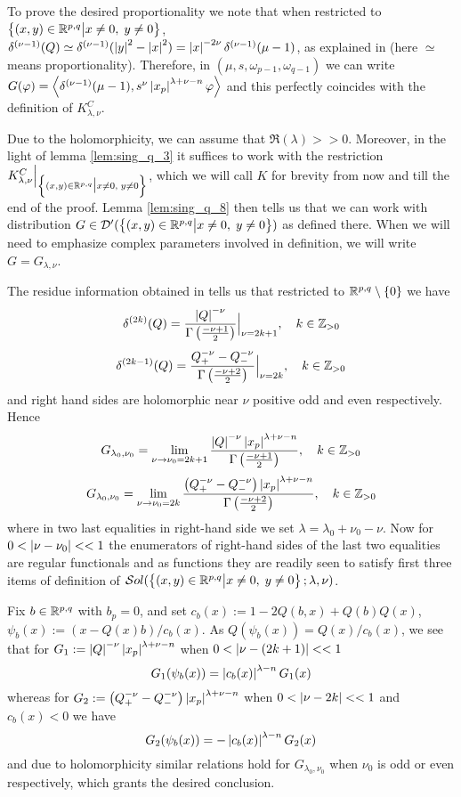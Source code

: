 \documentclass[10pt]{article} %
\newcommand{\D}{\mathcal{D}}
\theoremstyle{definition}
\theoremstyle{remark}
\begin{document}
\begin{myproof}
	To prove the desired proportionality we note that when restricted to $\Upp$, $\delta^{(\nu-1)}(Q)\simeq
	\delta^{(\nu-1)}(\myabs{y}^2-\myabs{x}^2)=\myabs{x}^{-2\nu}\delta^{(\nu-1)}(\mu-1)$, as explained in
	\cite[ch. III, sec 1.7]{gelfand1980distribution} (here $\simeq$ means proportionality). Therefore, in 
	$(\mu,s,\omega_{p-1},\omega_{q-1}
	)$ we can write $G(\phi)=\myabra{\delta^{(\nu-1)}(\mu-1),s^{\nu}\myabs{x_p}^{\lambda+\nu-n}\phi}$ and this
	perfectly coincides with the definition of $K_{\lambda,\nu}^C$.
\end{myproof}
\begin{myproof}
	Due to the holomorphicity, we can assume that $\Re(\lambda)>>0$.
	Moreover, in the light of lemma \ref{lem:sing_q_3} it suffices to work with the restriction $K^C_{\lambda,\nu}\Big|_{\Upp}$,
	which we will call $K$ for brevity from now and till the end of the proof. Lemma \ref{lem:sing_q_8} then tells
	us that we can work with distribution $G\in\D'(\Upp)$ as defined there. When we will need to emphasize complex parameters
	involved in definition, we will write $G=G_{\lambda,\nu}$.

	The residue information obtained in \cite[ch. III, sec 2.2]{gelfand1980distribution} tells us that restricted to 
	$\R^{p,q}\setminus\left\{ 0 \right\}$ we have
	\[\delta^{(2k)}(Q)=\frac{\myabs{Q}^{-\nu}}{\Gamma\left( \frac{-\nu+1}{2} \right)}\Big|_{\nu=2k+1},\quad k\in\Z_{>0}\]
	\[\delta^{(2k-1)}(Q)=\frac{Q_+^{-\nu}-Q_-^{-\nu}}{\Gamma\left( \frac{-\nu+2}{2} \right)}\Big|_{\nu=2k},\quad k\in\Z_{>0}\]
	and right hand sides are holomorphic near $\nu$ positive odd and even respectively. Hence
	\[G_{\lambda_0,\nu_0}=\lim_{\nu\to\nu_0=2k+1}\frac{\myabs{Q}^{-\nu}\myabs{x_p}^{\lambda+\nu-n}}
		{\Gamma\left( \frac{-\nu+1}{2} \right)},\quad k\in\Z_{>0}\]
	\[G_{\lambda_0,\nu_0}=\lim_{\nu\to\nu_0=2k}\frac{\mybra{Q_+^{-\nu}-Q_-^{-\nu}}\myabs{x_p}^{\lambda+\nu-n}}
		{\Gamma\left( \frac{-\nu+2}{2} \right)},\quad k\in\Z_{>0}\]
	where in two last equalities in right-hand side we set $\lambda=\lambda_0+\nu_0-\nu$.
	Now for $0<\myabs{\nu-\nu_0}<<1$ the enumerators of right-hand sides of the last two equalities are regular functionals
	and as functions they are readily seen to satisfy first three items of definition of $\sol[\Upp]$.

	Fix $b\in\R^{p,q}$ with $b_p=0$, and set $c_b(x):=1-2Q(b,x)+Q(b)Q(x)$, $\psi_b(x):=(x-Q(x)b)/c_b(x)$.
	As $Q(\psi_b(x))=Q(x)/c_b(x)$,
	we see that for $G_1:={\myabs{Q}^{-\nu}\myabs{x_p}^{\lambda+\nu-n}}$ when $0<\myabs{\nu-(2k+1)}<<1$
	\[G_1(\psi_b(x))=\myabs{c_b(x)}^{\lambda-n}G_1(x)\]
	whereas for $G_2:={\mybra{Q_+^{-\nu}-Q_-^{-\nu}}\myabs{x_p}^{\lambda+\nu-n}}$ when $0<\myabs{\nu-2k}<<1$
	and $c_b(x)<0$ we have
	\[G_2(\psi_b(x))=-\myabs{c_b(x)}^{\lambda-n}G_2(x)\]
	and due to holomorphicity similar relations hold for $G_{\lambda_0,\nu_0}$ when $\nu_0$ is odd or even respectively,
	which grants the desired conclusion.
\end{myproof}
\end{document}
